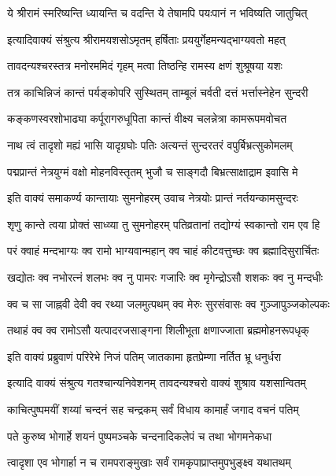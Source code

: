 \twolineshloka
{ये श्रीरामं स्मरिष्यन्ति ध्यायन्ति च वदन्ति ये}
{तेषामपि पयःपानं न भविष्यति जातुचित्}%

\twolineshloka
{इत्यादिवाक्यं संश्रुत्य श्रीरामयशसोऽमृतम्}
{हर्षिताः प्रययुर्गेहमन्यद्भाग्यवतो महत्}%

\twolineshloka
{तावदन्यश्चरस्तत्र मनोरममिदं गृहम्}
{मत्वा तिष्ठन्हि रामस्य क्षणं शुश्रूषया यशः}%

\twolineshloka
{तत्र काचिन्निजं कान्तं पर्यङ्कोपरि सुस्थितम्}
{ताम्बूलं चर्वती दत्तं भर्त्तास्नेहेन सुन्दरी}%

\twolineshloka
{कङ्कणस्वरशोभाढ्या कर्पूरागरुधूपिता}
{कान्तं वीक्ष्य चलन्नेत्रा कामरूपमवोचत}%

\twolineshloka
{नाथ त्वं तादृशो मह्यं भासि यादृग्रघोः पतिः}
{अत्यन्तं सुन्दरतरं वपुर्बिभ्रत्सुकोमलम्}%

\twolineshloka
{पद्मप्रान्तं नेत्रयुग्मं वक्षो मोहनविस्तृतम्}
{भुजौ च साङ्गदौ बिभ्रत्साक्षाद्राम इवासि मे}%

\twolineshloka
{इति वाक्यं समाकर्ण्य कान्तायाः सुमनोहरम्}
{उवाच नेत्रयोः प्रान्तं नर्तयन्कामसुन्दरः}%

\twolineshloka
{शृणु कान्ते त्वया प्रोक्तं साध्व्या तु सुमनोहरम्}
{पतिव्रतानां तद्योग्यं स्वकान्तो राम एव हि}%

\twolineshloka
{परं क्वाहं मन्दभाग्यः क्व रामो भाग्यवान्महान्}
{क्व चाहं कीटवत्तुच्छः क्व ब्रह्मादिसुरार्चितः}%

\twolineshloka
{खद्योतः क्व नभोरत्नं शलभः क्व नु पामरः}
{गजारिः क्व मृगेन्द्रोऽसौ शशकः क्व नु मन्दधीः}%

\twolineshloka
{क्व च सा जाह्नवी देवी क्व रथ्या जलमुत्पथम्}
{क्व मेरुः सुरसंवासः क्व गुञ्जापुञ्जकोल्पकः}%

\twolineshloka
{तथाहं क्व क्व रामोऽसौ यत्पादरजसाङ्गना}
{शिलीभूता क्षणाज्जाता ब्रह्ममोहनरूपधृक्}%

\twolineshloka
{इति वाक्यं प्रब्रुवाणं परिरेभे निजं पतिम्}
{जातकामा हृतप्रेम्णा नर्तित भ्रू धनुर्धरा}%

\twolineshloka
{इत्यादि वाक्यं संश्रुत्य गतश्चान्यनिवेशनम्}
{तावदन्यश्चरो वाक्यं शुश्राव यशसान्वितम्}%

\twolineshloka
{काचित्पुष्पमयीं शय्यां चन्दनं सह चन्द्रकम्}
{सर्वं विधाय कामार्हं जगाद वचनं पतिम्}%

\twolineshloka
{पते कुरुष्व भोगार्हे शयनं पुष्पमञ्चके}
{चन्दनादिकलेपं च तथा भोगमनेकधा}%

\twolineshloka
{त्वादृशा एव भोगार्हा न च रामपराङ्मुखाः}
{सर्वं रामकृपाप्राप्तमुपभुङ्क्ष्व यथातथम्}%

